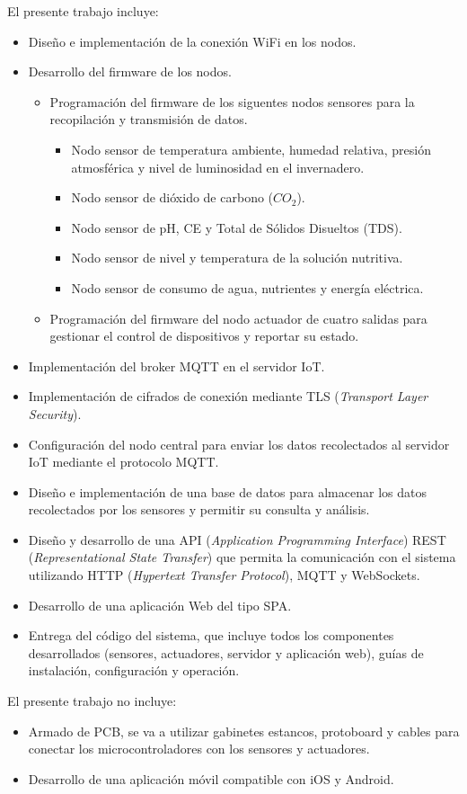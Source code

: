 El presente trabajo incluye:
\begin{itemize}
	\item Diseño e implementación de la conexión WiFi en los nodos.
	\item Desarrollo del firmware de los nodos.
	      \begin{itemize}
		      \item Programación del firmware de los siguentes nodos sensores para la recopilación
		            y transmisión de datos.
		            \begin{itemize}
			            \item Nodo sensor de temperatura ambiente, humedad relativa, presión atmosférica y nivel de luminosidad en el invernadero.
			            \item Nodo sensor de dióxido de carbono ($CO_2$).
			            \item Nodo sensor de pH, CE y Total de Sólidos Disueltos (TDS).
			            \item Nodo sensor de nivel y temperatura de la solución nutritiva.
			            \item Nodo sensor de consumo de agua, nutrientes y energía eléctrica.
		            \end{itemize}
		      \item Programación del firmware del nodo actuador de cuatro salidas para gestionar el
		            control de dispositivos y reportar su estado.
	      \end{itemize}
	\item Implementación del broker MQTT en el servidor IoT.
	\item Implementación de cifrados de conexión mediante TLS (\textit{Transport Layer Security}).
	\item Configuración del nodo central para enviar los datos recolectados al servidor IoT mediante el protocolo MQTT.
	\item Diseño e implementación de una base de datos para almacenar los datos recolectados por los sensores y permitir su consulta y análisis.
	\item Diseño y desarrollo de una API (\textit{Application Programming Interface}) REST (\textit{Representational State Transfer}) que permita 
		  la comunicación con el sistema utilizando HTTP (\textit{Hypertext Transfer Protocol}), MQTT y WebSockets.
	\item Desarrollo de una aplicación Web del tipo SPA.
	\item Entrega del código del sistema, que incluye todos los componentes desarrollados (sensores, actuadores, servidor y aplicación web), guías de instalación,
	      configuración y operación.
\end{itemize}

El presente trabajo no incluye:
\begin{itemize}
	\item Armado de PCB, se va a utilizar gabinetes estancos, protoboard y cables para conectar los microcontroladores con los sensores y actuadores.
	\item Desarrollo de una aplicación móvil compatible con iOS y Android.
\end{itemize}